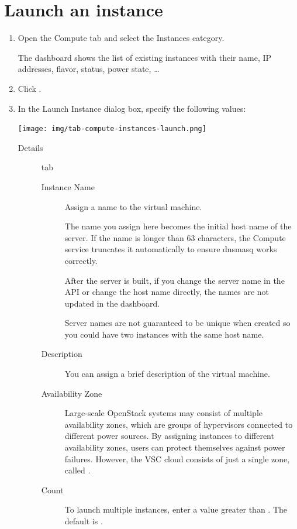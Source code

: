 \section{Launch an instance}\label{launch-an-instance}
\begin{enumerate}
\item Open the Compute tab and select the Instances category.

  The dashboard shows the list of existing instances with their name,
  IP addresses, flavor, status, power state, \ldots
\item Click .
\item In the Launch Instance dialog box, specify the following values:

  \begin{center}
    \texttt{[image: img/tab-compute-instances-launch.png]}
  \end{center}
  
  \begin{description}
  \item[Details] tab
    \begin{description}
    \item[Instance Name] Assign a name to the virtual machine.

       The name you assign here becomes the initial host
      name of the server. If the name is longer than 63 characters,
      the Compute service truncates it automatically to ensure dnsmasq
      works correctly.

      After the server is built, if you change the server name in the
      API or change the host name directly, the names are not updated
      in the dashboard.

      Server names are not guaranteed to be unique when created so you
      could have two instances with the same host name.

    \item[Description] You can assign a brief description of the
      virtual machine.
    \item[Availability Zone] Large-scale OpenStack systems may consist
      of multiple availability zones, which are groups of hypervisors
      connected to different power sources. By assigning instances to
      different availability zones, users can protect themselves
      against power failures.  However, the VSC cloud consists of just
      a single zone, called .
    \item[Count] To launch multiple instances, enter a value greater
      than . The default is .
    \end{description}


\end{description}
\end{enumerate}
